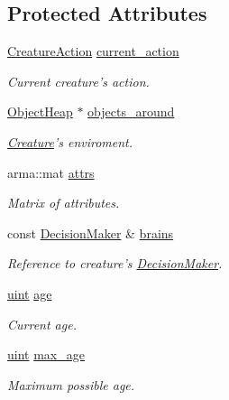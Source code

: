 \subsection*{Protected Attributes}
\begin{DoxyCompactItemize}
\item 
\hyperlink{BasicTypes_8h_a5303344c79577371e13252b373606706}{Creature\-Action} \hyperlink{classCreature_a3f97c007c64aa78502e9fa9cab716408}{current\-\_\-action}
\begin{DoxyCompactList}\small\item\em Current creature's action. \end{DoxyCompactList}\item 
\hyperlink{classObjectHeap}{Object\-Heap} $\ast$ \hyperlink{classCreature_a2941f1bf4753c4cc196ca7b20ade706c}{objects\-\_\-around}
\begin{DoxyCompactList}\small\item\em \hyperlink{classCreature}{Creature}'s enviroment. \end{DoxyCompactList}\item 
arma\-::mat \hyperlink{classCreature_a641e41105d04d3faf56ca7a0132586e2}{attrs}
\begin{DoxyCompactList}\small\item\em Matrix of attributes. \end{DoxyCompactList}\item 
const \hyperlink{classDecisionMaker}{Decision\-Maker} \& \hyperlink{classCreature_a8499febfbaad5783181a01000cbc4dc6}{brains}
\begin{DoxyCompactList}\small\item\em Reference to creature's \hyperlink{classDecisionMaker}{Decision\-Maker}. \end{DoxyCompactList}\item 
\hyperlink{BasicTypes_8h_a91ad9478d81a7aaf2593e8d9c3d06a14}{uint} \hyperlink{classCreature_aa3544784cbb26961f214a39b49fd171e}{age}
\begin{DoxyCompactList}\small\item\em Current age. \end{DoxyCompactList}\item 
\hyperlink{BasicTypes_8h_a91ad9478d81a7aaf2593e8d9c3d06a14}{uint} \hyperlink{classCreature_a57d8397db4c0e505deff7c1d7cead3e1}{max\-\_\-age}
\begin{DoxyCompactList}\small\item\em Maximum possible age. \end{DoxyCompactList}\item 

\end{DoxyCompactItemize}
